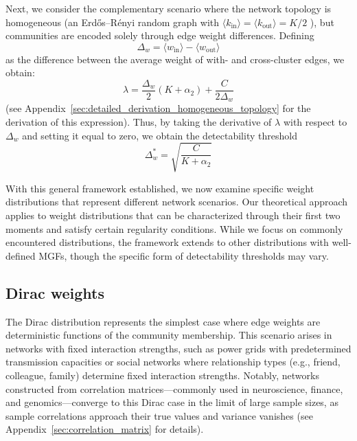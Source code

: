 \documentclass[a4paper,pre,superscriptaddress,floatfix,nofootinbib,twocolumn]{revtex4-1}
\begin{document}
Next, we consider the complementary scenario where the network topology is homogeneous (an Erd\H{o}s--R\'enyi random graph with
$\langle k_{\text{in}} \rangle = \langle k_{\text{out}} \rangle = K/2$
), but communities are encoded solely through edge weight differences.
Defining
\begin{equation}
\Delta_{w} = \langle w_\text{in} \rangle - \langle w_\text{out} \rangle
\label{eq:delta_omega}
\end{equation}
as the difference between the average weight of with- and cross-cluster edges, we obtain:
\begin{equation}
    \lambda = \frac{\Delta_{w}}{2} \left(K + \alpha_2 \right) + \frac{C}{2 \Delta_{w}}
    \label{eq:lambda_moment_homogeneous_weights_general_omega}
\end{equation}
(see Appendix~\ref{sec:detailed_derivation_homogeneous_topology} for the derivation of this expression).
Thus, by taking the derivative of $\lambda$ with respect to $\Delta_{w}$ and setting it equal to zero, we obtain the detectability threshold
\begin{equation}
\Delta_{w}^* = \sqrt{\frac{C }{K + \alpha_{2}}}
    \label{eq:delta_omega_threshold_homogeneous_topology}
\end{equation}


With this general framework established, we now examine specific weight distributions that represent different network scenarios. Our theoretical approach applies to weight distributions that can be characterized through their first two moments and satisfy certain regularity conditions. While we focus on commonly encountered distributions,
the framework extends to other distributions with well-defined MGFs, though the specific form of detectability thresholds may vary.

\subsection*{Dirac weights}
\label{sec:dirac_weights}

The Dirac distribution represents the simplest case where edge weights are deterministic functions of the community membership. This scenario arises in networks with fixed interaction strengths, such as power grids with predetermined transmission capacities or social networks where relationship types (e.g., friend, colleague, family) determine fixed interaction strengths. Notably, networks constructed from correlation matrices---commonly used in neuroscience, finance, and genomics---converge to this Dirac case in the limit of large sample sizes, as sample correlations approach their true values and variance vanishes (see Appendix~\ref{sec:correlation_matrix} for details).
\end{document}
